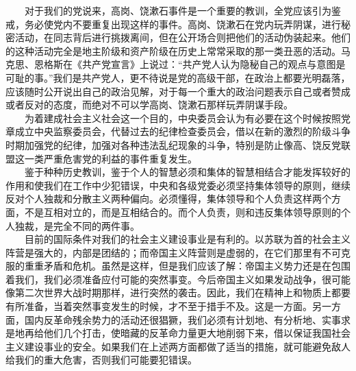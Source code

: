 \documentclass[cn,11pt,chinese]{elegantbook}
\begin{document}
　　对于我们的党说来，高岗、饶漱石事件是一个重要的教训，全党应该引为鉴戒，务必使党内不要重复出现这样的事件。高岗、饶漱石在党内玩弄阴谋，进行秘密活动，在同志背后进行挑拨离间，但在公开场合则把他们的活动伪装起来。他们的这种活动完全是地主阶级和资产阶级在历史上常常采取的那一类丑恶的活动。马克思、恩格斯在《共产党宣言》上说过：“共产党人认为隐秘自己的观点与意图是可耻的事。”我们是共产党人，更不待说是党的高级干部，在政治上都要光明磊落，应该随时公开说出自己的政治见解，对于每一个重大的政治问题表示自己或者赞成或者反对的态度，而绝对不可以学高岗、饶漱石那样玩弄阴谋手段。\\
　　为着建成社会主义社会这一个目的，中央委员会认为有必要在这个时候按照党章成立中央监察委员会，代替过去的纪律检查委员会，借以在新的激烈的阶级斗争时期加强党的纪律，加强对各种违法乱纪现象的斗争，特别是防止像高、饶反党联盟这一类严重危害党的利益的事件重复发生。\\
　　鉴于种种历史教训，鉴于个人的智慧必须和集体的智慧相结合才能发挥较好的作用和使我们在工作中少犯错误，中央和各级党委必须坚持集体领导的原则，继续反对个人独裁和分散主义两种偏向。必须懂得，集体领导和个人负责这样两个方面，不是互相对立的，而是互相结合的。而个人负责，则和违反集体领导原则的个人独裁，是完全不同的两件事。\\
　　目前的国际条件对我们的社会主义建设事业是有利的。以苏联为首的社会主义阵营是强大的，内部是团结的；而帝国主义阵营则是虚弱的，在它们那里有不可克服的重重矛盾和危机。虽然是这样，但是我们应该了解：帝国主义势力还是在包围着我们，我们必须准备应付可能的突然事变。今后帝国主义如果发动战争，很可能像第二次世界大战时期那样，进行突然的袭击。因此，我们在精神上和物质上都要有所准备，当着突然事变发生的时候，才不至于措手不及。这是一方面。另一方面，国内反革命残余势力的活动还很猖獗，我们必须有计划地、有分析地、实事求是地再给他们几个打击，使暗藏的反革命力量更大地削弱下来，借以保证我国社会主义建设事业的安全。如果我们在上述两方面都做了适当的措施，就可能避免敌人给我们的重大危害，否则我们可能要犯错误。\\
\end{document}
